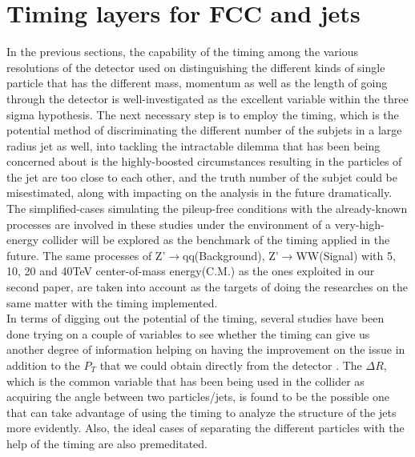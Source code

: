 \section{Timing layers for FCC and jets}
In the previous sections, the capability of the timing among the various resolutions of the detector used on distinguishing the different kinds of single particle that has the different mass, momentum as well as the length of going through the detector is well-investigated as the excellent variable within the three sigma hypothesis. The next necessary step is to employ the timing, which is the potential method of discriminating the different number of the subjets in a large radius jet as well, into tackling the intractable dilemma that has been being concerned about is the highly-boosted circumstances resulting in the particles of the jet are too close to each other, and the truth number of the subjet could be misestimated, along with impacting on the analysis in the future dramatically.\\ 

The simplified-cases simulating the pileup-free conditions with the already-known processes are involved in these studies under the environment of a very-high-energy collider will be explored as the benchmark of the timing applied in the future. The same processes of Z'$\rightarrow$qq(Background), Z'$\rightarrow$WW(Signal) with 5, 10, 20 and 40TeV center-of-mass energy(C.M.) as the ones exploited in our second paper, are taken into account as the targets of doing the researches on the same matter with the timing implemented.\\ 

In terms of digging out the potential of the timing, several studies have been done trying on a couple of variables to see whether the timing can give us another degree of information helping on having the improvement on the issue in addition to the $P_{T}$ that we could obtain directly from the detector . The $\Delta R$, which is the common variable that has been being used in the collider as acquiring the angle between two particles/jets, is found to be the possible one that can take advantage of using the timing to analyze the structure of the jets more evidently. Also, the ideal cases of separating the different particles with the help of the timing are also premeditated.\\

